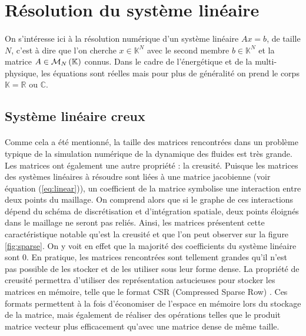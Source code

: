 \section{Résolution du système linéaire}

	\paragraph{}
	On s'intéresse ici à la résolution numérique d'un système linéaire $Ax = b$, de taille $N$, c'est à dire que l'on cherche $x\in\mathbb{K}^N$ avec le second membre $b\in\mathbb{K}^N$ et la matrice $A\in\mathcal{M}_{N}\left(\mathbb{K}\right)$ connus.
	Dans le cadre de l'énergétique et de la multi-physique, les équations sont réelles mais pour plus de généralité on prend le corps $\mathbb{K} = \mathbb{R}\textrm{ ou }\mathbb{C}$.


	\subsection{Système linéaire creux}

		\paragraph{}
		Comme cela a été mentionné, la taille des matrices rencontrées dans un problème typique de la simulation numérique de la dynamique des fluides est très grande.
		Les matrices ont également une autre propriété : la creusité.
		Puisque les matrices des systèmes linéaires à résoudre sont liées à une matrice jacobienne (voir équation (\ref{eq:linear})), un coefficient de la matrice symbolise une interaction entre deux points du maillage.
		On comprend alors que si le graphe de ces interactions dépend du schéma de discrétisation et d'intégration spatiale, deux points éloignés dans le maillage ne seront pas reliés.
		Ainsi, les matrices présentent cette caractéristique notable qu'est la creusité et que l'on peut observer sur la figure \ref{fig:sparse}.
		On y voit en effet que la majorité des coefficients du système linéaire sont 0.
		En pratique, les matrices rencontrées sont tellement grandes qu'il n'est pas possible de les stocker et de les utiliser sous leur forme dense.
		La propriété de creusité permettra d'utiliser des représentation astucieuses pour stocker les matrices en mémoire, telle que le format CSR (Compressed Sparse Row) \cite{Saad2003}.
		Ces formats permettent à la fois d'économiser de l'espace en mémoire lors du stockage de la matrice, mais également de réaliser des opérations telles que le produit matrice vecteur plus efficacement qu'avec une matrice dense de même taille.

